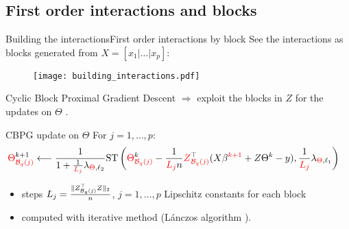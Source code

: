 \documentclass[10pt,aspectratio=43]{beamer}
\begin{document}
\subsection{First order interactions and blocks}
\begin{frame}{Building the interactions}{First order interactions by block}
See the interactions as blocks generated from $X=[x_1|\dots|x_p]$:
\begin{figure}[h]
    \centering
    \texttt{[image: building\_interactions.pdf]}
\end{figure}
\end{frame}

\begin{frame}{Cyclic Block Proximal Gradient Descent}
$\Longrightarrow$ exploit the blocks in $Z$ for the updates on $\Theta$
\citep{massias2019sparse,Beck17}.

\begin{block}{CBPG update on $\Theta$}
For $j=1,\dots,p$:
\begin{align*}
\textcolor{red}{\Theta}_{\textcolor{red}{\mathcal{B}_{q}(j)}}^{k+1} & \longleftarrow \frac{1}{1 +
\frac{1}{\textcolor{red}{L_j}} \lambda_{\textcolor{red}{\Theta}, \ell_2}}
\mathrm{ST}
\left( \textcolor{red}{\Theta}_{\textcolor{red}{\mathcal{B}_{q}(j)}}^k - \frac{1}{\textcolor{red}{L_j} n}
\textcolor{red}{Z}_{\textcolor{red}{\mathcal{B}_{q}(j)}}^\top (X\beta^{\textcolor{red}{k+1}} + Z\Theta^k - y),
\frac{1}{\textcolor{red}{L_j}}\lambda_{\textcolor{red}{\Theta}, \ell_1}
\right)
\end{align*}
\end{block}

\begin{itemize}
    \item steps $L_j=\tfrac{\|Z_{\mathcal{B}_{q}(j)}^\top Z\|_2}{n}$, $j=1,\dots,p$ Lipschitz constants for each block
    \item computed with iterative method (L\'{a}nczos algorithm \citep{lanczos1952solution}).
\end{itemize}
\end{frame}


\end{document}
